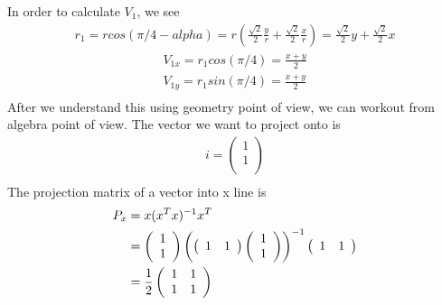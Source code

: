 \documentclass[a4paper]{article}
\begin{document}
In order to calculate $V_1$,  we see
\begin{align*}
r_1 = r cos(\pi/4 - alpha) =r( \frac{\sqrt{2}}{2} \frac{y}{r} + \frac{\sqrt{2}}{2} \frac{x}{r}) = \frac{\sqrt 2}{2}y +\frac{\sqrt2}{2} x
\end{align*}
\begin{align*}
V_{1x}=r_1cos(\pi/4)=\frac{x+y}{2}\\
V_{1y}=r_1sin(\pi/4)=\frac{x+y}{2}\\
\end{align*}
After we understand this using geometry point of view, we can workout from algebra point of view. The vector we want to project onto is
\begin{align*}
i = \left( \begin{array} {c }
              1  \\
              1  \\
            \end{array} \right)\\
\end{align*}
The projection matrix of a vector into x line is 
\begin{align*}
P_x & = x(x^Tx)^{-1}x^T \\
     & = \left( \begin{array} {c}
              1 \\
              1 \\
            \end{array} \right)
\left( \left( \begin{array} {c c}
              1 & 1\\
            \end{array} \right) 
          \left( \begin{array} {c }
              1 \\
              1 \\
            \end{array} \right) \right)^{-1}
 \left( \begin{array} { c  c } 
                   1 & 1\\
           \end{array} \right) \\
       & =  \frac{1}{2}\left( \begin{array} { c  c } 
                   1 & 1  \\
                   1 & 1  \\
           \end{array} \right)
\end{align*}
\end{document}
